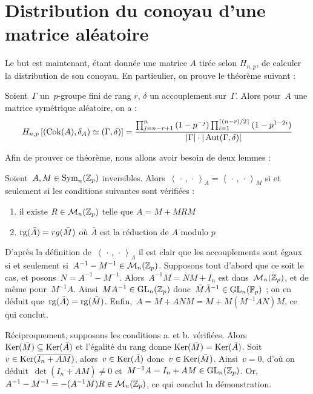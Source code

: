 \section{Distribution du conoyau d'une matrice aléatoire}

Le but est maintenant, étant donnée une matrice $A$ tirée selon $H_{n,p}$, de calculer la distribution de son conoyau.
En particulier, on prouve le théorème suivant :

\begin{thm}
Soient~$\Gamma$ un~$p$-groupe fini de rang $r$, $\delta$ un accouplement sur~$\Gamma$.
Alors pour~$A$ une matrice symétrique aléatoire, on a :
\[ H_{n,p}\left[(\operatorname{Cok}(A),\delta_A) \simeq (\Gamma,\delta)\right] = \frac{\prod_{j=n-r+1}^{n}{(1-p^{-j})}\prod_{i=1}^{\lceil (n-r)/2\rceil}{(1-p^{1-2i})}}{|\Gamma|\cdot|\operatorname{Aut}(\Gamma,\delta)|}\]
\end{thm} 

Afin de prouver ce théorème, nous allons avoir besoin de deux lemmes :

\begin{lem}
Soient~$A,M\in\operatorname{Sym}_n(\mathbb{Z}_p)$ inversibles. Alors~$\left<\,\cdot\,,\,\cdot\,\right>_{\!A} = \left<\,\cdot\,,\,\cdot\,\right>_{\!M}$ si et seulement si les conditions suivantes sont vérifiées :
\begin{enumerate}
\item il existe $R\in\mathcal M_n(\mathbb{Z}_p)$ telle que $A=M+MRM$
\item $\operatorname{rg}(\bar A) = rg(\bar M)$ où $\bar A$ est la réduction de $A$ modulo $p$
\end{enumerate}
\end{lem}

\begin{dem}
D'après la définition de~$\left<\,\cdot\,,\,\cdot\,\right>_{\!A}$ il est clair que les accouplements sont égaux si et seulement si~$A^{-1} - M^{-1} \in \mathcal{M}_n(\mathbb{Z}_p)$.
Supposons tout d'abord que ce soit le cas, et posons~$N = A^{-1} - M^{-1}$. Alors~$A^{-1}M = NM+I_n$ est dans~$\mathcal M_n(\mathbb{Z}_p)$, et de même pour~$M^{-1}A$. 
Ainsi~$MA^{-1}\in \operatorname{GL}_n(\mathbb{Z}_p)$ donc~$\bar M\bar A^{-1}\in \operatorname{GL}_n(\mathbb F_p)$ ; on en déduit que~$\operatorname{rg}(\bar A) = \operatorname{rg}(\bar M)$.
Enfin,~$A = M+ANM = M + M(M^{-1}AN)M$, ce qui conclut.

Réciproquement, supposons les conditions a. et b. vérifiées. Alors~$\operatorname{Ker}(\bar M) \subseteq \operatorname{Ker}(\bar A)$ et l'égalité du rang donne $\operatorname{Ker}(\bar M) = \operatorname{Ker}(\bar A)$.
Soit~$v\in\operatorname{Ker}(\overline{I_n+AM})$, alors~$v\in\operatorname{Ker}(\bar A)$ donc~$v\in\operatorname{Ker}(\bar M)$. Ainsi~$v = 0$, d'où on déduit~$\det(\overline{I_n+AM})\neq 0$ et~$M^{-1}A = I_n+AM \in\operatorname{GL}_n(\mathbb{Z}_p)$.
Or, $A^{-1}-M^{-1} = -(A^{-1}M)R \in\mathcal M_n(\mathbb{Z}_p)$,  ce qui conclut la démonstration.
\end{dem}

